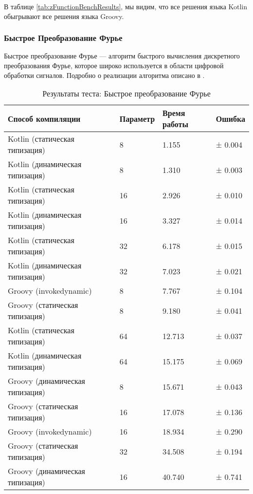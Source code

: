 В таблице \ref{tab:zFunctionBenchResults}, мы видим, что все решения языка Kotlin обыгрывают все решения языка Groovy.

\subsubsection{Быстрое Преобразование Фурье}

Быстрое преобразование Фурье --- алгоритм быстрого вычисления дискретного преобразования Фурье, которое широко используется в области цифровой обработки сигналов. Подробно о реализации алгоритма описано в \cite{algo:dasgypta2014algo}.

\begin{table}[h]
\caption{\label{tab:fftResults}Результаты теста: Быстрое преобразование Фурье}
\begin{center}
\begin{tabular}{|l|l|l|l|}
\hline
Способ компиляции & Параметр	& Время работы & Ошибка \\
\hline
Kotlin (статическая типизация)           &  8 &   1.155 & ± 0.004 \\
Kotlin (динамическая типизация)          &  8 &   1.310 & ± 0.003 \\
Kotlin (статическая типизация)           & 16 &   2.926 & ± 0.010 \\
Kotlin (динамическая типизация)          & 16 &   3.327 & ± 0.014 \\
Kotlin (статическая типизация)           & 32 &   6.178 & ± 0.015 \\
Kotlin (динамическая типизация)          & 32 &   7.023 & ± 0.021 \\
Groovy (invokedynamic)                   &  8 &   7.767 & ± 0.104 \\
Groovy (статическая типизация)           &  8 &   9.180 & ± 0.041 \\
Kotlin (статическая типизация)           & 64 &  12.713 & ± 0.037 \\
Kotlin (динамическая типизация)          & 64 &  15.175 & ± 0.069 \\
Groovy (динамическая типизация)          &  8 &  15.671 & ± 0.043 \\
Groovy (статическая типизация)           & 16 &  17.078 & ± 0.136 \\
Groovy (invokedynamic)                   & 16 &  18.934 & ± 0.290 \\
Groovy (статическая типизация)           & 32 &  34.508 & ± 0.194 \\
Groovy (динамическая типизация)          & 16 &  40.740 & ± 0.741 \\

\end{tabular}
\end{center}
\end{table}

